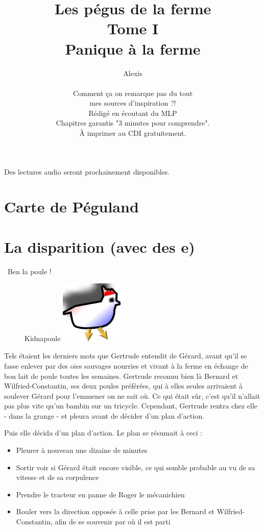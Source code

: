 \documentclass[a5paper, 10pt, twoside]{book}
\title{Les pégus de la ferme\\Tome I\\Panique à la ferme}
\author{Alexis \bsc{Cabodi}\\\\
\cg Comment ça on remarque pas du tout\\mes sources d'inspiration ?!\cd
\\\cg Rédigé en écoutant du MLP\cd
\\\cg Chapitres garantis "3 minutes pour comprendre".\cd
\\\cg À imprimer au CDI gratuitement.\cd
}
\date{}
\newcommand{\cg}{\guillemotleft~}
\newcommand{\cd}{~\guillemotright}
\begin{document}
\maketitle

\renewcommand{\contentsname}{Sommaire}
\tableofcontents

\vfill %
Des lectures audio seront prochainement disponibles.


\newpage
\newpage

\chapter*{Carte de Péguland}

\newpage
\newpage


\chapter{La disparition (avec des e)}
\cg Ben la poule !\cd

\begin{figure} %
\begin{center}
Kidnapoule
\includegraphics[width=3cm]{imgs/trobelpoule.png}
\end{center}
\end{figure}
Tels étaient les derniers mots que Gertrude entendit de Gérard, avant qu'il se fasse enlever par des oies sauvages nourries et vivant à la ferme en échange de bon lait de poule toutes les semaines. Gertrude reconnu bien là Bernard et Wilfried-Constantin, ses deux poules préférées, qui à elles seules arrivaient à soulever Gérard pour l'emmener on ne sait où. Ce qui était sûr, c'est qu'il n'allait pas plus vite qu'un bambin sur un tricycle. Cependant, Gertrude rentra chez elle - dans la grange - et pleura avant de décider d'un plan d'action.

Puis elle décida d'un plan d'action. Le plan se résumait à ceci :
\begin{itemize}
	\item Pleurer à nouveau une dizaine de minutes
	\item Sortir voir si Gérard était encore visible, ce qui semble probable au vu de sa vitesse et de sa corpulence
	\item Prendre le tracteur en panne de Roger le mécanichien
	\item Rouler vers la direction opposée à celle prise par les Bernard et Wilfried-Constantin, afin de se souvenir par où il est parti
\end{itemize}
\end{document}
